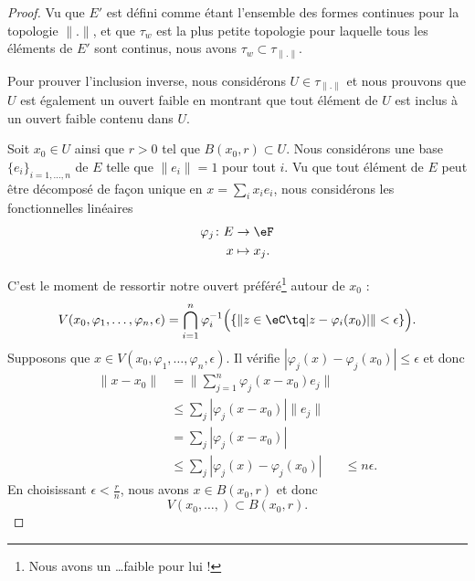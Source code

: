 \begin{proof}
    Vu que \( E'\) est défini comme étant l'ensemble des formes continues pour la topologie \( \| . \|\), et que \( \tau_w\) est la plus petite topologie pour laquelle tous les éléments de \( E'\) sont continus, nous avons \( \tau_w\subset\tau_{\| . \|}\).

    Pour prouver l'inclusion inverse, nous considérons \( U\in\tau_{\| . \|}\) et nous prouvons que \( U\) est également un ouvert faible en montrant que tout élément de $U$ est inclus à un ouvert faible contenu dans \( U\).


    Soit \( x_0\in U\) ainsi que \( r>0\) tel que \( B(x_0,r)\subset U\). Nous considérons une base \( \{ e_i \}_{i=1,\ldots, n}\) de \( E\) telle que \( \| e_i \|=1\) pour tout \( i\). Vu que tout élément de \( E\) peut être décomposé de façon unique en \( x=\sum_ix_ie_i\), nous considérons les fonctionnelles linéaires
    \begin{equation}
        \begin{aligned}
            \varphi_j\colon E&\to \eF \\
            x&\mapsto x_j. 
        \end{aligned}
    \end{equation}
    
    C'est le moment de ressortir notre ouvert préféré\footnote{Nous avons un \ldots faible pour lui !} autour de \( x_0\) :
    \begin{equation}
    V(x_0,\varphi_1,\ldots, \varphi_n,\epsilon)=\bigcap_{i=1}^n\varphi_i^{-1}\Big( \{  \| z\in \eC\tq | z-\varphi_i(x_0) | \|<\epsilon  \} \Big).
    \end{equation}
    Supposons que \( x\in V(x_0,\varphi_1,\ldots, \varphi_n,\epsilon)\). Il vérifie \( | \varphi_j(x)-\varphi_j(x_0) |\leq \epsilon\) et donc
    \begin{subequations}
        \begin{align}
            \| x-x_0 \|&=\| \sum_{j=1}^n\varphi_j(x-x_0)e_j \|\\
            &\leq \sum_j| \varphi_j(x-x_0) |\| e_j \|\\
            &= \sum_j| \varphi_j(x-x_0) |\\
            &\leq \sum_j| \varphi_j(x)-\varphi_j(x_0) |
            &\leq n\epsilon.
        \end{align}
    \end{subequations}
    En choisissant \( \epsilon<\frac{ r }{ n }\), nous avons \( x\in B(x_0,r)\) et donc 
    \begin{equation}
        V(x_0,\ldots, )\subset B(x_0,r).
    \end{equation}
\end{proof}

